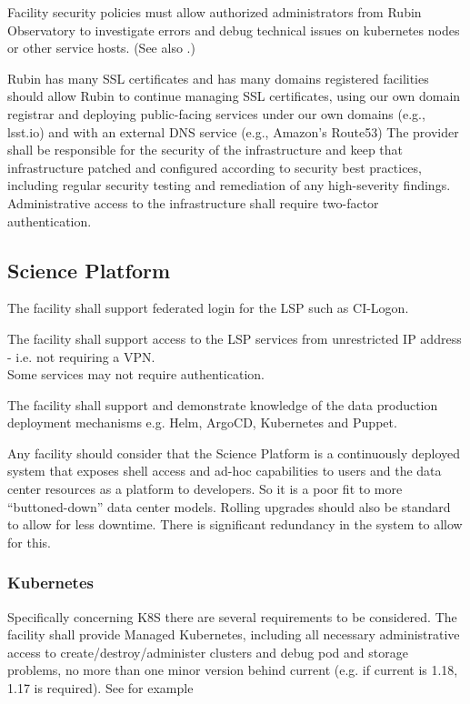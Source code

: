 Facility  security policies  must allow authorized administrators from Rubin Observatory to investigate errors and debug technical issues on kubernetes nodes or other service hosts. (See also  .)

\reqsimp{}{}{}{}{}{}
{
Rubin has many SSL certificates and has many domains registered facilities should  allow Rubin to continue  managing SSL certificates,  using our own domain registrar and  deploying public-facing services under our own domains (e.g., lsst.io) and with an external DNS service (e.g., Amazon’s Route53)
}
\reqsimp{}{}{}{}{}{}
{
The provider shall be responsible for the security of the infrastructure and keep that infrastructure patched and configured according to security best practices, including regular security testing and remediation of any high-severity findings.
}
\reqsimp{}{}{}{}{}{}
{
	Administrative access to the infrastructure shall require two-factor authentication. \label{req:2fa}
}


\subsection{Science Platform}
\reqsimp{}{}{}{}{} {The facility shall support federated login for the \gls{LSP}
such as \gls{CI}-Logon. \label{req:cil}}

\reqsimp{}{}{}{}{} {The facility shall support access to the \gls{LSP} services from
unrestricted IP address - i.e. not requiring a \gls{VPN}. \label{req:novpn}}
\\ Some services may not require authentication.

\reqsimp{}{}{}{}{} { The facility shall support and demonstrate knowledge of the data
production deployment mechanisms e.g. Helm, ArgoCD, Kubernetes and Puppet.
}

Any facility should consider that the Science Platform is a
continuously deployed system that exposes shell access and ad-hoc
capabilities to users and the data center resources as a platform to
developers. So it is a poor fit to more “buttoned-down” data center
models. Rolling upgrades should also be standard to allow for less
downtime. There is significant redundancy in the system to allow for this.


\subsubsection{Kubernetes}\label{sec:k8s}
Specifically concerning K8S there are several requirements to be considered.
\reqsimp{}{}{}{}{}{}
{
 The facility shall provide  Managed Kubernetes, including all necessary administrative access to create/destroy/administer clusters and debug pod and storage problems, no more than one minor version behind current (e.g. if current is 1.18, 1.17 is required).
	See for example  \label{req:k8s}	}

